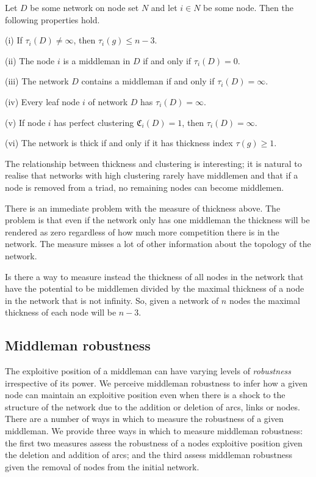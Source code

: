 \begin{proposition}
Let $D$ be some network on node set $N$ and let $i \in N$ be some node. Then the following properties hold.

\begin{abet}

\item[(i)] If $\tau_{i}(D) \neq \infty$, then $\tau_{i}(g) \leqslant n-3$.

\item[(ii)] The node $i$ is a middleman in $D$ if and only if $\tau_{i}(D) = 0$.

\item[(iii)] The network $D$ contains a middleman if and only if $\tau_{i}(D) = \infty$.

\item[(iv)] Every leaf node $i$ of network $D$ has $\tau_{i}(D)=\infty$.

\item[(v)] If node $i$ has perfect clustering $\mathfrak{C}_{i}(D) = 1$, then $\tau_{i}(D) = \infty.$

\item[(vi)] The network is thick if and only if it has thickness index $\tau(g) \geqslant 1$.
\end{abet}
\end{proposition}

The relationship between thickness and clustering is interesting; it is natural to realise that networks with high clustering rarely have middlemen and that if a node is removed from a triad, no remaining nodes can become middlemen.

There is an immediate problem with the measure of thickness above. The problem is that even if the network only has one middleman the thickness will be rendered as zero regardless of how much more competition there is in the network. The measure misses a lot of other information about the topology of the network.

Is there a way to measure instead the thickness of all nodes in the network that have the potential to be middlemen divided by the maximal thickness of a node in the network that is not infinity. So, given a network of $n$ nodes the maximal thickness of each node will be $n-3$.

\subsection{Middleman robustness}

The exploitive position of a middleman can have varying levels of \emph{robustness} irrespective of its power. We perceive middleman robustness to infer how a given node can maintain an exploitive position even when there is a shock to the structure of the network due to the addition or deletion of arcs, links or nodes. There are a number of ways in which to measure the robustness of a given middleman. We provide three ways in which to measure middleman robustness: the first two measures assess the robustness of a nodes exploitive position given the deletion and addition of arcs; and the third assess middleman robustness given the removal of nodes from the initial network.

